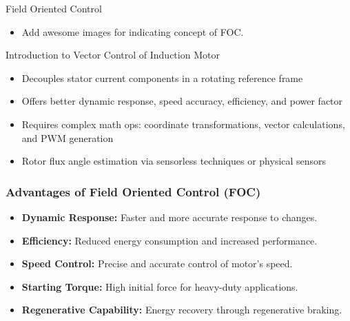 


\begin{frame}{}
	\maketitle
\end{frame}

\begin{frame}{Field Oriented Control}
	\begin{itemize}
		\item Add awesome images for indicating concept of FOC.
	\end{itemize}
\end{frame}


\begin{frame}{Introduction to Vector Control of Induction Motor}
	\begin{itemize}
		\item Decouples stator current components in a rotating reference frame
		\item Offers better dynamic response, speed accuracy, efficiency, and power factor
		\item Requires complex math ops: coordinate transformations, vector calculations, and PWM generation
		\item Rotor flux angle estimation via sensorless techniques or physical sensors
	\end{itemize}
	\end{frame}

\begin{frame}
	\frametitle{Advantages of Field Oriented Control (FOC)}
	\begin{itemize}
		\item \textbf{Dynamic Response:} Faster and more accurate response to changes.
		\item \textbf{Efficiency:} Reduced energy consumption and increased performance.
		\item \textbf{Speed Control:} Precise and accurate control of motor's speed.
		\item \textbf{Starting Torque:} High initial force for heavy-duty applications.
		\item \textbf{Regenerative Capability:} Energy recovery through regenerative braking.
	\end{itemize}
\end{frame}


